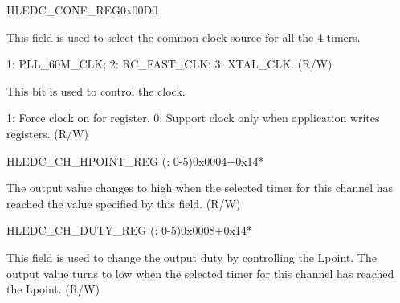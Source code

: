 \begin{register}{H}{LEDC\_CONF\_REG}{0x00D0}\label{regdesc:LEDCCONFREG}
%
%
%
\regnewline%
\begin{regdesc}\begin{reglist}
\label{fielddesc:LEDCCLKSEL}\item [LEDC\_CLK\_SEL] This field is used to select the common clock source for all the 4 timers.

1: PLL\_60M\_CLK; 2: RC\_FAST\_CLK; 3: XTAL\_CLK. (R/W)
\label{fielddesc:LEDCCLKEN}\item [LEDC\_CLK\_EN] This bit is used to control the clock.

1: Force clock on for register. 0: Support clock only when application writes registers. (R/W)
\end{reglist}\end{regdesc}
\end{register}


\begin{register}{H}{LEDC\_CH\_HPOINT\_REG (: 0-5)}{0x0004+0x14*}\label{regdesc:LEDCCHNHPOINTREG}
%
%
\regnewline%
\begin{regdesc}\begin{reglist}
\label{fielddesc:LEDCHPOINTCHN}\item [LEDC\_HPOINT\_CH\regindex{n}] The output value changes to high when the selected timer for this channel has reached the value specified by this field. (R/W)
\end{reglist}\end{regdesc}
\end{register}


\begin{register}{H}{LEDC\_CH\_DUTY\_REG (: 0-5)}{0x0008+0x14*}\label{regdesc:LEDCCHNDUTYREG}
%
%
\regnewline%
\begin{regdesc}\begin{reglist}
\label{fielddesc:LEDCDUTYCHN}\item [LEDC\_DUTY\_CH\regindex{n}] This field is used to change the output duty by controlling the Lpoint. The output value turns to low when the selected timer for this channel has reached the Lpoint. (R/W)
\end{reglist}\end{regdesc}
\end{register}



